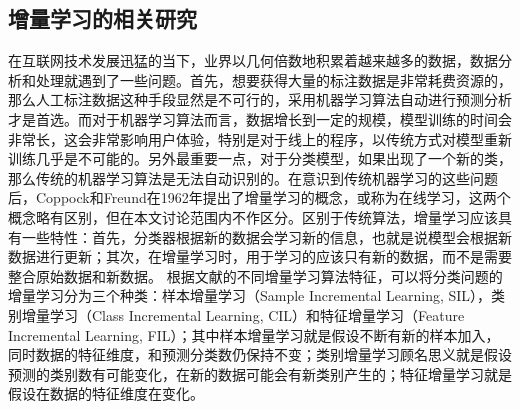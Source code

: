 \subsection {增量学习的相关研究}
在互联网技术发展迅猛的当下，业界以几何倍数地积累着越来越多的数据，数据分析和处理就遇到了一些问题。首先，想要获得大量的标注数据是非常耗费资源的，那么人工标注数据这种手段显然是不可行的，采用机器学习算法自动进行预测分析才是首选。而对于机器学习算法而言，数据增长到一定的规模，模型训练的时间会非常长，这会非常影响用户体验，特别是对于线上的程序，以传统方式对模型重新训练几乎是不可能的。另外最重要一点，对于分类模型，如果出现了一个新的类，那么传统的机器学习算法是无法自动识别的。在意识到传统机器学习的这些问题后，Coppock和Freund在1962年提出了增量学习的概念\cite{coppock1962all}，或称为在线学习，这两个概念略有区别，但在本文讨论范围内不作区分。区别于传统算法，增量学习应该具有一些特性：首先，分类器根据新的数据会学习新的信息，也就是说模型会根据新数据进行更新；其次，在增量学习时，用于学习的应该只有新的数据，而不是需要整合原始数据和新数据。 根据文献的不同增量学习算法特征，可以将分类问题的增量学习分为三个种类：样本增量学习（Sample Incremental Learning, SIL），类别增量学习（Class Incremental Learning, CIL）和特征增量学习（Feature Incremental Learning, FIL）\cite{zhong2017survey}；其中样本增量学习就是假设不断有新的样本加入，同时数据的特征维度，和预测分类数仍保持不变；类别增量学习顾名思义就是假设预测的类别数有可能变化，在新的数据可能会有新类别产生的；特征增量学习就是假设在数据的特征维度在变化。

